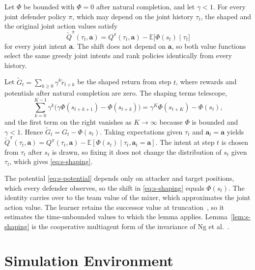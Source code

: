 \begin{lemma}
\label{lem:s-shaping}
Let $\Phi$ be bounded with $\Phi=0$ after natural completion, and let $\gamma<1$. For every joint defender policy $\pi$, which may depend on the joint history $\tau_t$, the shaped and the original joint action values satisfy
\begin{equation}
\tilde Q^{\pi}(\tau_t,\mathbf a)=Q^{\pi}(\tau_t,\mathbf a)-\mathbb E\big[\Phi(s_t)\mid\tau_t\big]
\label{eq:s-shaping}
\end{equation}
for every joint intent $\mathbf a$. The shift does not depend on $\mathbf a$, so both value functions select the same greedy joint intents and rank policies identically from every history.
\end{lemma}

\begin{IEEEproof}
Let $\tilde G_t=\sum_{k\ge0}\gamma^k\tilde r_{t+k}$ be the shaped return from step $t$, where rewards and potentials after natural completion are zero. The shaping terms telescope,
\begin{equation*}
\sum_{k=0}^{K-1}\gamma^k\big(\gamma\Phi(s_{t+k+1})-\Phi(s_{t+k})\big)=\gamma^{K}\Phi(s_{t+K})-\Phi(s_t),
\end{equation*}
and the first term on the right vanishes as $K\to\infty$ because $\Phi$ is bounded and $\gamma<1$. Hence $\tilde G_t=G_t-\Phi(s_t)$. Taking expectations given $\tau_t$ and $\mathbf a_t=\mathbf a$ yields $\tilde Q^{\pi}(\tau_t,\mathbf a)=Q^{\pi}(\tau_t,\mathbf a)-\mathbb E[\Phi(s_t)\mid\tau_t,\mathbf a_t=\mathbf a]$. The intent at step $t$ is chosen from $\tau_t$ after $s_t$ is drawn, so fixing it does not change the distribution of $s_t$ given $\tau_t$, which gives \eqref{eq:s-shaping}.
\end{IEEEproof}

The potential \eqref{eq:s-potential} depends only on attacker and target positions, which every defender observes, so the shift in \eqref{eq:s-shaping} equals $\Phi(s_t)$. The identity carries over to the team value of the mixer, which approximates the joint action value. The learner retains the successor value at truncation~\cite{pardo2018timelimits}, so it estimates the time-unbounded values to which the lemma applies. Lemma~\ref{lem:s-shaping} is the cooperative multiagent form of the invariance of Ng et al.~\cite{ng1999shaping,devlin2011shaping}.

\section{Simulation Environment}
\label{sec:s-env}

